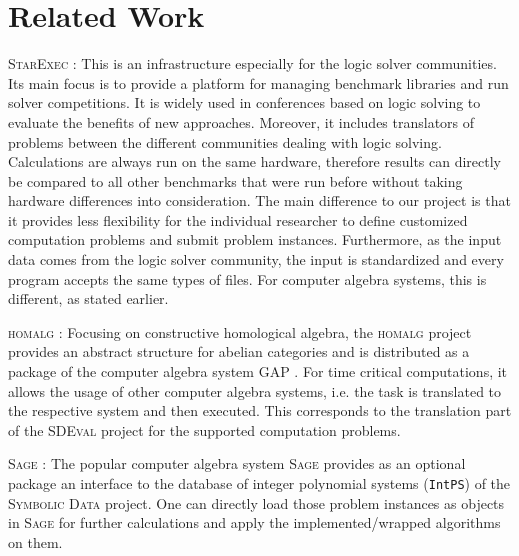 \documentclass[oribibl,11pt]{article}
\begin{document}



\section{Related Work}
\label{sctn:relatedWork}

\textsc{StarExec} \cite{stump2012introducing}: This is an
infrastructure especially for the logic solver communities. Its main
focus is to provide a platform 
for managing benchmark libraries and run solver competitions. It is widely used in
conferences based on logic solving to evaluate the benefits of new
approaches. Moreover, it includes translators of problems between the
different communities dealing with logic solving. Calculations are
always run on the same hardware, therefore results can directly be
compared to all other benchmarks that were run before without taking
hardware differences into consideration. The main difference to our
project is that it provides less flexibility for the individual
researcher to define customized computation problems and submit problem
instances. Furthermore, as the input data comes from the logic solver
community, the input is standardized and every program accepts the
same types of files. For computer algebra systems, this is
different, as stated earlier.%

\textsc{homalg} \cite{barakat2008homalg}: Focusing on constructive
homological algebra, the \textsc{homalg} project provides an abstract
structure for abelian categories and is distributed as a package of
the computer algebra system \textsc{GAP} \cite{GAP4}. For time
critical computations, it allows the usage of other computer algebra
systems, i.e. the task is translated to the respective system and then
executed.  This corresponds to the translation part of the
\textsc{SDEval} project for the supported computation problems.

\textsc{Sage} \cite{stein2008sage}: The popular computer algebra
system \textsc{Sage} provides as an optional package an interface to
the database of integer polynomial systems (\texttt{IntPS}) of the
\textsc{Symbolic Data} project. One can directly load those problem
instances as objects in \textsc{Sage} for further calculations and
apply the implemented/wrapped algorithms on them.
\end{document}
